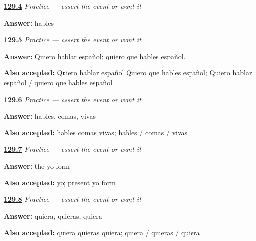 \noindent\begin{minipage}[t]{\linewidth}
\raggedright
\hyperlink{review-ES-C18-practice-fact-wanted}{\textbf{129.4}} \emph{Practice — assert the event or want it}\par
\small \textbf{Answer:} hables\par
\end{minipage}\par\medskip

\noindent\begin{minipage}[t]{\linewidth}
\raggedright
\hyperlink{review-ES-C18-practice-one-two}{\textbf{129.5}} \emph{Practice — assert the event or want it}\par
\small \textbf{Answer:} Quiero hablar español; quiero que hables español.\par
\footnotesize \textbf{Also accepted:} Quiero hablar español Quiero que hables español; Quiero hablar español / quiero que hables español
\end{minipage}\par\medskip

\noindent\begin{minipage}[t]{\linewidth}
\raggedright
\hyperlink{review-ES-C18-practice-regular-rows}{\textbf{129.6}} \emph{Practice — assert the event or want it}\par
\small \textbf{Answer:} hables, comas, vivas\par
\footnotesize \textbf{Also accepted:} hables comas vivas; hables / comas / vivas
\end{minipage}\par\medskip

\noindent\begin{minipage}[t]{\linewidth}
\raggedright
\hyperlink{review-ES-C18-practice-yo-stem}{\textbf{129.7}} \emph{Practice — assert the event or want it}\par
\small \textbf{Answer:} the yo form\par
\footnotesize \textbf{Also accepted:} yo; present yo form
\end{minipage}\par\medskip

\noindent\begin{minipage}[t]{\linewidth}
\raggedright
\hyperlink{review-ES-C18-practice-querer}{\textbf{129.8}} \emph{Practice — assert the event or want it}\par
\small \textbf{Answer:} quiera, quieras, quiera\par
\footnotesize \textbf{Also accepted:} quiera quieras quiera; quiera / quieras / quiera
\end{minipage}\par\medskip

